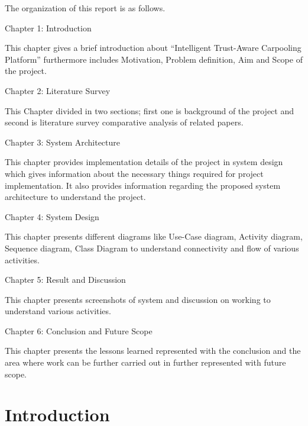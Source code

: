\documentclass[12pt,a4paper,oneside]{report}
\begin{document}
\clearpage
The organization of this report is as follows.\par
\vspace{0.5cm}
Chapter 1: Introduction\par
This chapter gives a brief introduction about “Intelligent Trust-Aware Carpooling Platform” furthermore includes Motivation, Problem definition, Aim and Scope of the project.
\par
\vspace{0.5cm}
Chapter 2: Literature Survey\par
This Chapter divided in two sections; first one is background of the project and second is literature survey comparative analysis of related papers.\par
\vspace{0.5cm}
Chapter 3: System Architecture\par
This chapter provides implementation details of the project in system design which gives information about the necessary things required for project implementation. It also provides information regarding the proposed system architecture to understand the project.\par
\vspace{0.5cm}
Chapter 4: System Design\par
This chapter presents different diagrams like Use-Case diagram, Activity diagram, Sequence diagram, Class Diagram to understand connectivity and flow of various activities.\par
\vspace{0.5cm}
Chapter 5: Result and Discussion\par
This chapter presents screenshots of system and discussion on working to understand various activities.\par
\vspace{0.5cm}
Chapter 6: Conclusion and Future Scope\par
This chapter presents the lessons learned represented with the conclusion and the area where work can be further carried out in further represented with future scope.

\clearpage
{}
\setcounter{page}{1}

\chapter{Introduction}
\end{document}
